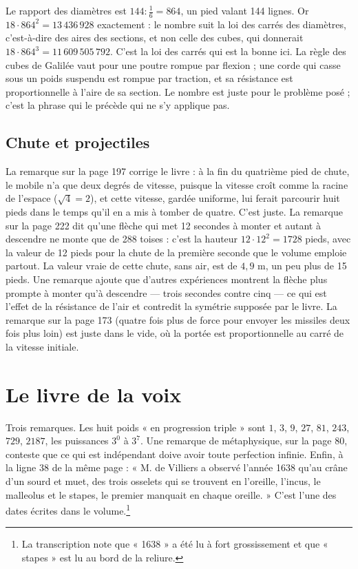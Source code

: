 \documentclass[11pt,a4paper]{article}
\begin{document}
Le rapport des diamètres est $144 : \frac16 = 864$, un pied valant 144
lignes. Or $18 \cdot 864^2 = 13\,436\,928$ exactement : le nombre suit la loi
des carrés des diamètres, c'est-à-dire des aires des sections, et non celle des
cubes, qui donnerait $18 \cdot 864^3 = 11\,609\,505\,792$. C'est la loi des
carrés qui est la bonne ici. La règle des cubes de Galilée vaut pour une
poutre rompue par flexion ; une corde qui casse sous un poids suspendu est
rompue par traction, et sa résistance est proportionnelle à l'aire de sa
section. Le nombre est juste pour le problème posé ; c'est la phrase qui le
précède qui ne s'y applique pas.

\subsection*{Chute et projectiles}

La remarque sur la page 197 corrige le livre : à la fin du quatrième pied de
chute, le mobile n'a que deux degrés de vitesse, puisque la vitesse croît comme
la racine de l'espace ($\sqrt4 = 2$), et cette vitesse, gardée uniforme, lui
ferait parcourir huit pieds dans le temps qu'il en a mis à tomber de quatre.
C'est juste. La remarque sur la page 222 dit qu'une flèche qui met 12 secondes à
monter et autant à descendre ne monte que de 288 toises : c'est la hauteur
$12 \cdot 12^2 = 1728$ pieds, avec la valeur de 12 pieds pour la chute de la
première seconde que le volume emploie partout. La valeur vraie de cette
chute, sans air, est de $4{,}9$ m, un peu plus de 15 pieds. Une remarque
ajoute que d'autres expériences montrent la flèche plus prompte à monter qu'à
descendre — trois secondes contre cinq — ce qui est l'effet de la résistance de
l'air et contredit la symétrie supposée par le livre. La remarque sur la page
173 (quatre fois plus de force pour envoyer les missiles deux fois plus loin)
est juste dans le vide, où la portée est proportionnelle au carré de la
vitesse initiale.

\section*{Le livre de la voix}

Trois remarques. Les huit poids « en progression triple » sont
$1$, $3$, $9$, $27$, $81$, $243$, $729$, $2187$, les puissances $3^0$ à $3^7$. Une remarque de
métaphysique, sur la page 80, conteste que ce qui est indépendant doive avoir
toute perfection infinie. Enfin, à la ligne 38 de la même page : « M. de
Villiers a observé l'année 1638 qu'au crâne d'un sourd et muet, des trois
osselets qui se trouvent en l'oreille, l'incus, le malleolus et le stapes, le
premier manquait en chaque oreille. » C'est l'une des dates écrites dans le
volume.\footnote{La transcription note que « 1638 » a été lu à fort
grossissement et que « stapes » est lu au bord de la reliure.}
\end{document}
